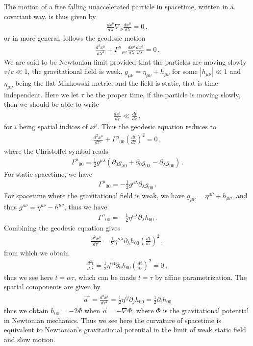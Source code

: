 \documentclass[11pt, onesided]{book}
\theoremstyle{break}
\theoremstyle{break}
\newcommand{\pd}{\partial}
\begin{document}
The motion of a free falling unaccelerated particle in spacetime, written in a covariant way, is thus given by
\begin{align*}
\frac{dx^\nu}{d\lambda} \nabla_\nu \frac{dx^\mu}{d\lambda} = 0\,,
\end{align*}
or in more general, follows the geodesic motion
\begin{align*}
\frac{d^2x^\mu}{d\lambda^2} + \Gamma^{\mu}{}_{\rho \sigma}\frac{dx^\rho}{d\lambda}\frac{dx^\sigma}{d\lambda} = 0\,.
\end{align*}
We are said to be Newtonian limit provided that the particles are moving slowly $v/c\ll 1$, the gravitational field is week, $g_{\mu\nu} = \eta_{\mu\nu}+h_{\mu\nu}$ for some $|h_{\mu\nu}|\ll 1$ and $\eta_{\mu\nu}$ being the flat Minkowski metric, and the field is static, that is time independent. Here we let $\tau$ be the proper time, if the particle is moving slowly, then we should be able to write
\begin{align*}
\frac{dx^i}{d\tau} \ll \frac{dt}{d\tau}\,,
\end{align*}
for $i$ being spatial indices of $x^\mu$. Thus the geodesic equation reduces to
\begin{align*}
\frac{d^2 x^\mu}{d\tau^2} + \Gamma^\mu{}_{00}\left( \frac{dt}{d\tau}\right)^2 = 0\,,
\end{align*}
where the Christoffel symbol reads
\begin{align*}
\Gamma^\mu{}_{00} = \frac{1}{2}g^{\mu \lambda}\left( \pd_0 g_{\lambda 0} + \pd_0 g_{0\lambda} - \pd_\lambda g_{00}\right)\,.
\end{align*}
For static spacetime, we have
\begin{align*}
\Gamma^\mu{}_{00} = -\frac{1}{2}g^{\mu\lambda}\pd_\lambda g_{00}\,.
\end{align*}
For spacetime where the gravitational field is weak, we have $g_{\mu\nu} = \eta^{\mu\nu}+ h_{\mu\nu}$, and thus $g^{\mu\nu} = \eta^{\mu\nu} - h^{\mu\nu}$, thus we have
\begin{align*}
\Gamma^{\mu}{}_{00} =- \frac{1}{2} \eta^{\mu\lambda} \pd_\lambda h_{00}\,.
\end{align*}
Combining the geodesic equation gives
\begin{align*}
\frac{d^2 x^\mu}{d\tau^2} = \frac{1}{2}\eta^{\mu \lambda} \pd_\lambda h_{00}\left( \frac{dt}{d\tau}\right)^2\,,
\end{align*}
from which we obtain
\begin{align*}
\frac{d^2 t}{d\tau^2} = \frac{1}{2}\eta^{00}\pd_0 h_{00}\left(\frac{dt}{d\tau}\right)^2 = 0\,,
\end{align*}
thus we see here $t = \alpha\tau$, which can be made $t = \tau$ by affine parametrization. The spatial components are given by
\begin{align*}
\vec{a}^i = \frac{d^2 x^i}{d\tau^2} = \frac{1}{2}\eta^{i j}\pd_j h_{00} =\frac{1}{2}\pd_i h_{00}
\end{align*}
thus we obtain $h_{00} = -2 \Phi$ when $\vec{a} = -\nabla \Phi$, where $\Phi$ is the gravitational potential in Newtonian mechanics. Thus we see here the curvature of spacetime is equivalent to Newtonian's gravitational potential in the limit of weak static field and slow motion. \\
\end{document}
